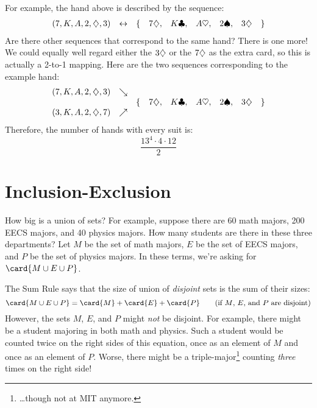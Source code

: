 For example, the hand above is described by the sequence:
%
\[
\begin{array}{rcrcccccl}
(7, K, A, 2, \diamondsuit, 3) & \leftrightarrow &
    \{ & 7 \diamondsuit, & K \clubsuit, & A \heartsuit, & 2 \spadesuit, & 3 \diamondsuit & \}
\end{array}
\]
%
Are there other sequences that correspond to the same hand?  There is
one more!  We could equally well regard either the $3 \diamondsuit$ or the $7
\diamondsuit$ as the extra card, so this is actually a 2-to-1 mapping.  Here
are the two sequences corresponding to the example hand:
%
\[
\begin{array}{rcrcccccl}
(7, K, A, 2, \diamondsuit, 3) & \searrow & \\
 && \{ & 7 \diamondsuit, & K \clubsuit, & A \heartsuit, & 2 \spadesuit, & 3 \diamondsuit & \} \\
(3, K, A, 2, \diamondsuit, 7) & \nearrow &
\end{array}
\]
%
Therefore, the number of hands with every suit is:
%
\[
\frac{13^4 \cdot 4 \cdot 12}{2}
\]

\begin{problems}
\classproblems
{}
\end{problems}



{\section{Inclusion-Exclusion}}

How big is a union of sets?  For example, suppose there are 60 math
majors, 200 EECS majors, and 40 physics majors.  How many students are
there in these three departments?  Let $M$ be the set of math majors,
$E$ be the set of EECS majors, and $P$ be the set of physics majors.  In
these terms, we're asking for $\card{M \cup E \cup P}$.

The Sum Rule says that the size of union of \emph{disjoint} sets is
the sum of their sizes:
%
\[
\card{M \cup E \cup P} = \card{M} + \card{E} + \card{P}
    \qquad \text{(if $M$, $E$, and $P$ are disjoint)}
\]
%
However, the sets $M$, $E$, and $P$ might \emph{not} be disjoint.  For
example, there might be a student majoring in both math and
physics.  Such a student would be counted twice on the right sides of this
equation, once as an element of $M$ and once as an element of $P$.  Worse,
there might be a triple-major\footnote{\dots though not at MIT anymore.}
counting \emph{three} times on the right side!

